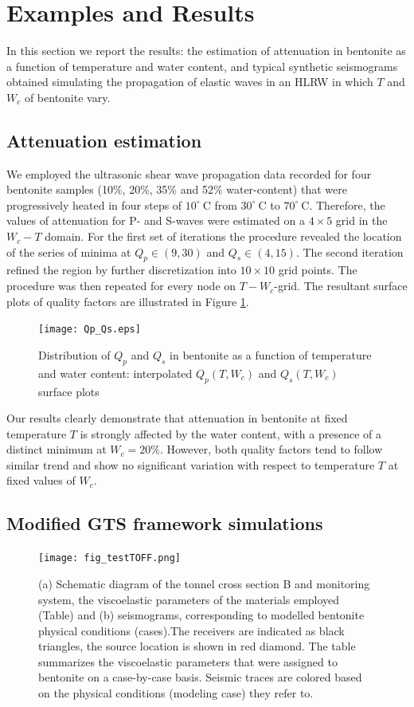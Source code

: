 \documentclass[letterpaper,11pt]{article}
\begin{document}
\section*{Examples and Results}

In this section we report the results: the estimation of attenuation in bentonite as a function of temperature and water content, and typical synthetic seismograms obtained simulating the propagation of elastic waves in an HLRW in which $T$ and $W_{c}$ of bentonite vary.
\subsection*{Attenuation estimation}
We employed the ultrasonic shear wave propagation data recorded for four bentonite samples (10\%, 20\%, 35\% and 52\% water-content) that were progressively heated in four steps of $10^{\circ}~\mathrm{C}$ from $30^{\circ}~\mathrm{C}$ to $70^{\circ}~\mathrm{C}$. Therefore, the values of attenuation for P- and S-waves were estimated on a $4\times5$ grid in the $W_{c}-T$ domain. For the first set of iterations the procedure revealed the location of the series of minima at $Q_{p} \in (9,30)$ and $Q_{s} \in (4,15)$. The second iteration refined the region by further discretization into $10\times10$ grid points. The procedure was then repeated for every node on $T-W_{c}$-grid. The resultant surface plots of quality factors are illustrated in Figure \ref{fig:qpqs}.
\begin{figure}
\texttt{[image: Qp\_Qs.eps]}
 \caption{Distribution of $Q_{p}$ and $Q_{s}$ in bentonite as a function of temperature and water content: interpolated $Q_{p}(T,W_{c})$ and $Q_{s}(T,W_{c})$ surface plots}
  \label{fig:qpqs}
\end{figure}
Our results clearly demonstrate that attenuation in bentonite at fixed temperature $T$ is strongly affected by the water content, with a presence of a distinct minimum at $W_{c}=20\%$. However, both quality factors tend to follow similar trend and show no significant variation with respect to temperature $T$ at fixed values of $W_{c}$. 
\subsection*{Modified GTS framework simulations}
\begin{figure}[htb]
\centering
\texttt{[image: fig\_testTOFF.png]}
 \caption{(a) Schematic diagram of the tonnel cross section B and monitoring system, the viscoelastic parameters of the materials employed (Table) and (b) seismograms, corresponding to modelled bentonite physical conditions (cases).The receivers are indicated as black triangles, the source location is shown in red diamond. The table summarizes the viscoelastic parameters that were assigned to bentonite on a case-by-case basis. Seismic traces are colored based on the physical conditions (modeling case) they refer to.}
  \label{fig:tunnel_off}
\end{figure}
\end{document}
